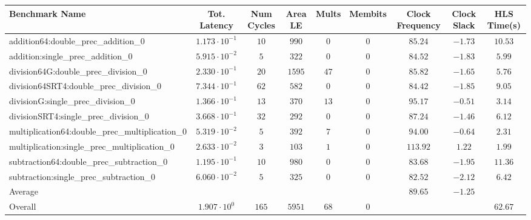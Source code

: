 \begin{tabular}{|l|c|c|c|c|c|c|c|c|}
\hline
Benchmark Name                                   & Tot. Latency            & Num Cycles & Area LE  & Mults  & Membits & Clock Frequency & Clock Slack & HLS Time(s) \\
\hline
addition64:double\_prec\_addition\_0             & $ 1.173 \cdot 10^{-1} $ & $ 10     $ & $ 990  $ & $ 0  $ & $ 0   $ & $ 85.24       $ & $ -1.73   $ & $ 10.53   $ \\
addition:single\_prec\_addition\_0               & $ 5.915 \cdot 10^{-2} $ & $ 5      $ & $ 322  $ & $ 0  $ & $ 0   $ & $ 84.52       $ & $ -1.83   $ & $ 5.99    $ \\
division64G:double\_prec\_division\_0            & $ 2.330 \cdot 10^{-1} $ & $ 20     $ & $ 1595 $ & $ 47 $ & $ 0   $ & $ 85.82       $ & $ -1.65   $ & $ 5.76    $ \\
division64SRT4:double\_prec\_division\_0         & $ 7.344 \cdot 10^{-1} $ & $ 62     $ & $ 582  $ & $ 0  $ & $ 0   $ & $ 84.42       $ & $ -1.85   $ & $ 9.05    $ \\
divisionG:single\_prec\_division\_0              & $ 1.366 \cdot 10^{-1} $ & $ 13     $ & $ 370  $ & $ 13 $ & $ 0   $ & $ 95.17       $ & $ -0.51   $ & $ 3.14    $ \\
divisionSRT4:single\_prec\_division\_0           & $ 3.668 \cdot 10^{-1} $ & $ 32     $ & $ 292  $ & $ 0  $ & $ 0   $ & $ 87.24       $ & $ -1.46   $ & $ 6.12    $ \\
multiplication64:double\_prec\_multiplication\_0 & $ 5.319 \cdot 10^{-2} $ & $ 5      $ & $ 392  $ & $ 7  $ & $ 0   $ & $ 94.00       $ & $ -0.64   $ & $ 2.31    $ \\
multiplication:single\_prec\_multiplication\_0   & $ 2.633 \cdot 10^{-2} $ & $ 3      $ & $ 103  $ & $ 1  $ & $ 0   $ & $ 113.92      $ & $ 1.22    $ & $ 1.99    $ \\
subtraction64:double\_prec\_subtraction\_0       & $ 1.195 \cdot 10^{-1} $ & $ 10     $ & $ 980  $ & $ 0  $ & $ 0   $ & $ 83.68       $ & $ -1.95   $ & $ 11.36   $ \\
subtraction:single\_prec\_subtraction\_0         & $ 6.060 \cdot 10^{-2} $ & $ 5      $ & $ 325  $ & $ 0  $ & $ 0   $ & $ 82.52       $ & $ -2.12   $ & $ 6.42    $ \\
\hline
Average                                          & $                     $ & $        $ & $      $ & $    $ & $     $ & $ 89.65       $ & $ -1.25   $ & $         $ \\
\hline
Overall                                          & $ 1.907 \cdot 10^{0}  $ & $ 165    $ & $ 5951 $ & $ 68 $ & $ 0   $ & $             $ & $         $ & $ 62.67   $ \\
\hline
\end{tabular}
